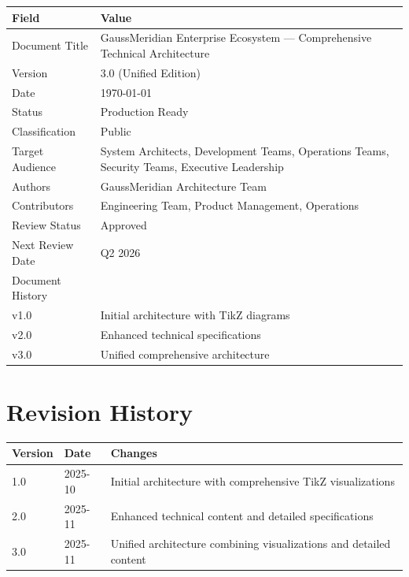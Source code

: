 \documentclass[12pt,a4paper,twoside]{report}
\begin{document}
\begin{table}[h]
\centering
\begin{tabular}{@{}p{4cm}p{8cm}@{}}
\toprule
\textbf{Field} & \textbf{Value} \\
\midrule
Document Title & GaussMeridian Enterprise Ecosystem — Comprehensive Technical Architecture \\
Version & 3.0 (Unified Edition) \\
Date & \today \\
Status & Production Ready \\
Classification & Public \\
Target Audience & System Architects, Development Teams, Operations Teams, Security Teams, Executive Leadership \\
Authors & GaussMeridian Architecture Team \\
Contributors & Engineering Team, Product Management, Operations \\
Review Status & Approved \\
Next Review Date & Q2 2026 \\
\midrule
Document History & \\
v1.0 & Initial architecture with TikZ diagrams \\
v2.0 & Enhanced technical specifications \\
v3.0 & Unified comprehensive architecture \\
\bottomrule
\end{tabular}
\end{table}

\section*{Revision History}

\begin{table}[h]
\centering
\begin{tabular}{@{}p{2cm}p{2.5cm}p{7cm}@{}}
\toprule
\textbf{Version} & \textbf{Date} & \textbf{Changes} \\
\midrule
1.0 & 2025-10 & Initial architecture with comprehensive TikZ visualizations \\
2.0 & 2025-11 & Enhanced technical content and detailed specifications \\
3.0 & 2025-11 & Unified architecture combining visualizations and detailed content \\
\bottomrule
\end{tabular}
\end{table}
\end{document}
